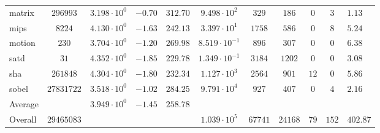 \begin{tabular}{|l|c|HHc|c|c|c|c|cH|}
matrix        & $ 296993   $ & $ 3.198 \cdot 10^{0} $ & $ -0.70 $ & $ 312.70 $ & $ 9.498 \cdot 10^{2}  $ & $ 329   $ & $ 186   $ & $ 0   $ & $ 3   $ & $ 1.13    $ \\
mips          & $ 8224     $ & $ 4.130 \cdot 10^{0} $ & $ -1.63 $ & $ 242.13 $ & $ 3.397 \cdot 10^{1}  $ & $ 1758  $ & $ 586   $ & $ 0   $ & $ 8   $ & $ 5.24    $ \\
motion        & $ 230      $ & $ 3.704 \cdot 10^{0} $ & $ -1.20 $ & $ 269.98 $ & $ 8.519 \cdot 10^{-1} $ & $ 896   $ & $ 307   $ & $ 0   $ & $ 0   $ & $ 6.38    $ \\
satd          & $ 31       $ & $ 4.352 \cdot 10^{0} $ & $ -1.85 $ & $ 229.78 $ & $ 1.349 \cdot 10^{-1} $ & $ 3184  $ & $ 1202  $ & $ 0   $ & $ 0   $ & $ 3.08    $ \\
sha           & $ 261848   $ & $ 4.304 \cdot 10^{0} $ & $ -1.80 $ & $ 232.34 $ & $ 1.127 \cdot 10^{3}  $ & $ 2564  $ & $ 901   $ & $ 12  $ & $ 0   $ & $ 5.86    $ \\
sobel         & $ 27831722 $ & $ 3.518 \cdot 10^{0} $ & $ -1.02 $ & $ 284.25 $ & $ 9.791 \cdot 10^{4}  $ & $ 927   $ & $ 407   $ & $ 0   $ & $ 4   $ & $ 2.16    $ \\
\hline
Average       & $          $ & $ 3.949 \cdot 10^{0} $ & $ -1.45 $ & $ 258.78 $ & $                     $ & $       $ & $       $ & $     $ & $     $ & $         $ \\
\hline
Overall       & $ 29465083 $ & $                    $ & $       $ & $        $ & $ 1.039 \cdot 10^{5}  $ & $ 67741 $ & $ 24168 $ & $ 79  $ & $ 152 $ & $ 402.87  $ \\
\hline
\end{tabular}
